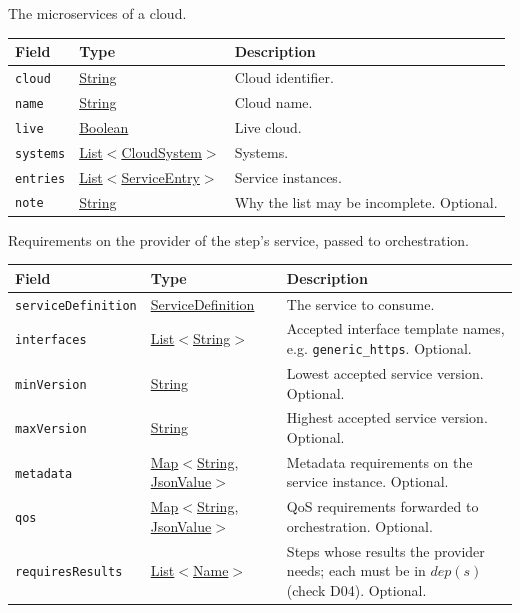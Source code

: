 \documentclass[a4paper]{arrowhead}
\newcommand{\mref}[1]{{\textcolor{ArrowheadPurple}{\hyperref[sec:model:#1]{#1}}}}
\newcommand{\pref}[1]{{\textcolor{ArrowheadGrey}{\hyperref[sec:model:primitives:#1]{#1}}}}
\begin{document}
The microservices of a cloud.

{\small
\begin{longtable}{|p{3.9cm}|p{4.4cm}|p{7.5cm}|}

\hline
\rowcolor{gray!33} Field & Type & Description \\ \hline
\endhead
\texttt{cloud} & \pref{String} & Cloud identifier. \\ \hline
\texttt{name} & \pref{String} & Cloud name. \\ \hline
\texttt{live} & \pref{Boolean} & Live cloud. \\ \hline
\texttt{systems} & \pref{List}$<$\mref{CloudSystem}$>$ & Systems. \\ \hline
\texttt{entries} & \pref{List}$<$\mref{ServiceEntry}$>$ & Service instances. \\ \hline
\texttt{note} & \pref{String} & Why the list may be incomplete. Optional. \\ \hline
\end{longtable}
}

Requirements on the provider of the step's service, passed to orchestration.

{\small
\begin{longtable}{|p{3.9cm}|p{4.4cm}|p{7.5cm}|}

\hline
\rowcolor{gray!33} Field & Type & Description \\ \hline
\endhead
\texttt{serviceDefinition} & \pref{ServiceDefinition} & The service to consume. \\ \hline
\texttt{interfaces} & \pref{List}$<$\pref{String}$>$ & Accepted interface template names, e.g. \texttt{generic\_https}. Optional. \\ \hline
\texttt{minVersion} & \pref{String} & Lowest accepted service version. Optional. \\ \hline
\texttt{maxVersion} & \pref{String} & Highest accepted service version. Optional. \\ \hline
\texttt{metadata} & \pref{Map}$<$\pref{String}, \pref{JsonValue}$>$ & Metadata requirements on the service instance. Optional. \\ \hline
\texttt{qos} & \pref{Map}$<$\pref{String}, \pref{JsonValue}$>$ & QoS requirements forwarded to orchestration. Optional. \\ \hline
\texttt{requiresResults} & \pref{List}$<$\pref{Name}$>$ & Steps whose results the provider needs; each must be in $dep(s)$ (check D04). Optional. \\ \hline
\end{longtable}
}
\end{document}
